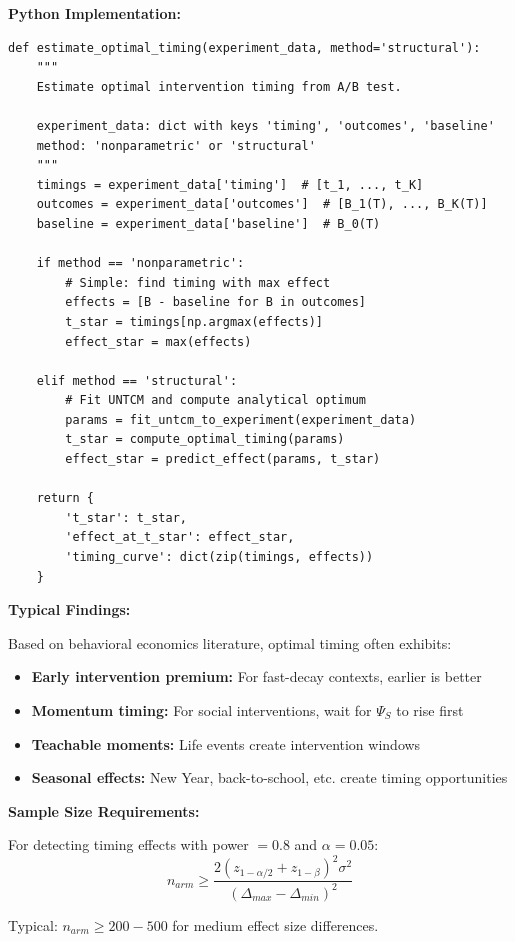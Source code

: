 \begin{tcolorbox}[colback=purple!5!white, colframe=purple!75!black,
    title=\textbf{Application UNTCM-E3: Optimal Intervention Timing from A/B Tests}]
\textbf{Python Implementation:}
\begin{verbatim}
def estimate_optimal_timing(experiment_data, method='structural'):
    """
    Estimate optimal intervention timing from A/B test.

    experiment_data: dict with keys 'timing', 'outcomes', 'baseline'
    method: 'nonparametric' or 'structural'
    """
    timings = experiment_data['timing']  # [t_1, ..., t_K]
    outcomes = experiment_data['outcomes']  # [B_1(T), ..., B_K(T)]
    baseline = experiment_data['baseline']  # B_0(T)

    if method == 'nonparametric':
        # Simple: find timing with max effect
        effects = [B - baseline for B in outcomes]
        t_star = timings[np.argmax(effects)]
        effect_star = max(effects)

    elif method == 'structural':
        # Fit UNTCM and compute analytical optimum
        params = fit_untcm_to_experiment(experiment_data)
        t_star = compute_optimal_timing(params)
        effect_star = predict_effect(params, t_star)

    return {
        't_star': t_star,
        'effect_at_t_star': effect_star,
        'timing_curve': dict(zip(timings, effects))
    }
\end{verbatim}

\textbf{Typical Findings:}

Based on behavioral economics literature, optimal timing often exhibits:
\begin{itemize}[nosep]
\item \textbf{Early intervention premium:} For fast-decay contexts, earlier is better
\item \textbf{Momentum timing:} For social interventions, wait for $\Psi_S$ to rise first
\item \textbf{Teachable moments:} Life events create intervention windows \citep{PAP-thaler2008}
\item \textbf{Seasonal effects:} New Year, back-to-school, etc. create timing opportunities
\end{itemize}

\textbf{Sample Size Requirements:}

For detecting timing effects with power $= 0.8$ and $\alpha = 0.05$:
\begin{equation}
n_{arm} \geq \frac{2(z_{1-\alpha/2} + z_{1-\beta})^2 \sigma^2}{(\Delta_{max} - \Delta_{min})^2}
\end{equation}

Typical: $n_{arm} \geq 200-500$ for medium effect size differences.

\end{tcolorbox}

